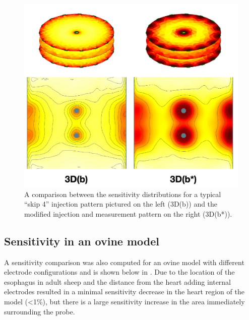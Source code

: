 \begin{figure}
\centering
\includegraphics[width=\textwidth]{chapter6-internal_electrodes/imgs/Injection_Comparison.pdf}
\caption[Sensitivity using internal electrodes with modified injection patterns]{A comparison between the sensitivity distributions for a typical ``skip 4'' injection pattern pictured on the left (3D(b)) and 
the modified injection and measurement pattern on the right (3D(b*)).}
\label{fig:modified_measurement_sens}
\end{figure}

\subsection{Sensitivity in an ovine model}

A sensitivity comparison was also computed for an ovine model with different 
electrode configurations 
and is shown below in 
. Due to the location of the esophagus in adult sheep
and the distance from the heart
adding internal electrodes resulted 
in a minimal sensitivity decrease in the 
heart region of the model (<1\%), but there is 
a large sensitivity increase in the area immediately surrounding the 
probe.

